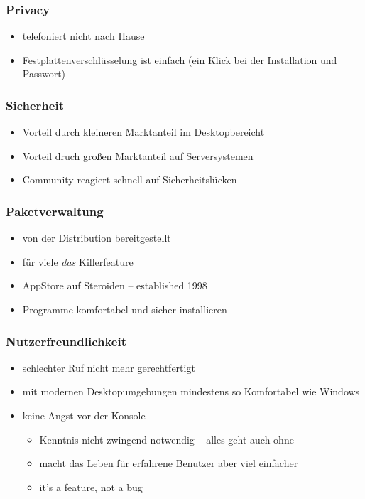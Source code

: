 \documentclass[t]{beamer}
\begin{document}
\begin{frame}
  \frametitle{Privacy}
  \begin{itemize}
  \item telefoniert nicht nach Hause
  \item Festplattenverschlüsselung ist einfach (ein Klick bei der
    Installation und Passwort)
  \end{itemize}
\end{frame}

\begin{frame}
  \frametitle{Sicherheit}
  \begin{itemize}
  \item Vorteil durch kleineren Marktanteil im Desktopbereicht
  \item Vorteil druch großen Marktanteil auf Serversystemen
  \item Community reagiert schnell auf Sicherheitslücken
  \end{itemize}
\end{frame}

\begin{frame}
  \frametitle{Paketverwaltung}
  \begin{itemize}
  \item von der Distribution bereitgestellt
  \item für viele \emph{das} Killerfeature
  \item AppStore auf Steroiden – established 1998
  \item Programme komfortabel und sicher installieren
  \end{itemize}
\end{frame}

\begin{frame}
  \frametitle{Nutzerfreundlichkeit}
  \begin{itemize}
  \item schlechter Ruf nicht mehr gerechtfertigt
  \item mit modernen Desktopumgebungen mindestens so Komfortabel wie
    Windows
  \item keine Angst vor der Konsole
    \begin{itemize}
    \item Kenntnis nicht zwingend notwendig – alles geht auch ohne
    \item macht das Leben für erfahrene Benutzer aber viel einfacher
    \item it's a feature, not a bug
    \end{itemize}
  \end{itemize}
\end{frame}
\end{document}
